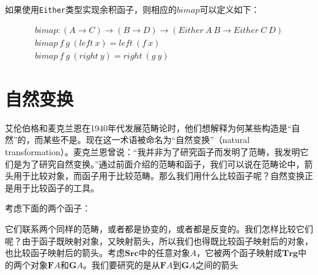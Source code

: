 \documentclass{article}
\begin{document}
如果使用\texttt{Either}类型实现余积函子，则相应的$bimap$可以定义如下：

\[
\begin{array}{l}
bimap : (A \to C) \to (B \to D) \to (Either\ A\ B \to Either\ C\ D) \\
bimap\ f\ g\ (left\ x) = left\ (f\ x) \\
bimap\ f\ g\ (right\ y) = right\ (g\ y)
\end{array}
\]

\begin{Exercise}
\end{Exercise}

\section{自然变换}

艾伦伯格和麦克兰恩在1940年代发展范畴论时，他们想解释为何某些构造是“自然”的，而某些不是。现在这一术语被命名为“自然变换”（natural transformation）。麦克兰恩曾说：“我并非为了研究函子而发明了范畴，我发明它们是为了研究自然变换。”通过前面介绍的范畴和函子，我们可以说在范畴论中，箭头用于比较对象，而函子用于比较范畴。那么我们用什么比较函子呢？自然变换正是用于比较函子的工具。


考虑下面的两个函子：

\begin{center}
\end{center}

它们联系两个同样的范畴，或者都是协变的，或者都是反变的。我们怎样比较它们呢？由于函子既映射对象，又映射箭头，所以我们也得既比较函子映射后的对象，也比较函子映射后的箭头。考虑$\pmb{Src}$中的任意对象$A$，它被两个函子映射成$\pmb{Trg}$中的两个对象$\mathbf{F}A$和$\mathbf{G}A$。我们要研究的是从$\mathbf{F}A$到$\mathbf{G}A$之间的箭头
\end{document}
